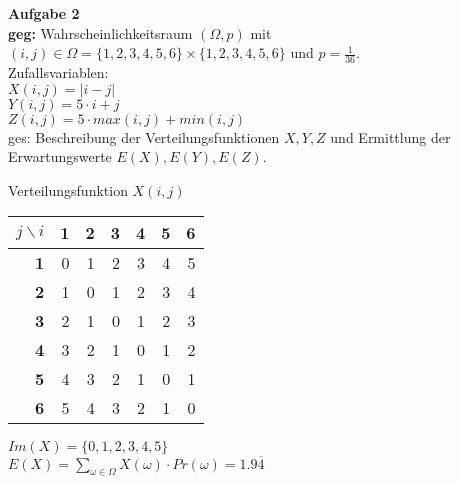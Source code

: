 \documentclass[a4paper]{scrartcl}
\begin{document}
	\begin{flushleft}
		\textbf{Aufgabe 2}\\
		\textbf{geg:} Wahrscheinlichkeitsraum $(\Omega,p)$ mit $(i,j)\in \Omega=\{1,2,3,4,5,6\}\times\{1,2,3,4,5,6\}$ und $p=\frac{1}{36}$.\\
		Zufallsvariablen:\\
		$X(i,j)=|i-j|$\\
		$Y(i,j)=5\cdot i+j$\\
		$Z(i,j)=5\cdot max(i,j)+min(i,j)$\\[1em]
		ges: Beschreibung der Verteilungsfunktionen $X,Y,Z$ und Ermittlung der Erwartungswerte $E(X),E(Y),E(Z)$.\\[1em]
		
		\begin{center}
		Verteilungsfunktion $X(i,j)$\\
		\begin{tabular}{|r|r|r|r|r|r|r|}
		\hline
		\multicolumn{1}{|c|}{$j\backslash i$} & \multicolumn{1}{c|}{\textbf{1}} & \multicolumn{1}{c|}{\textbf{2}} & \multicolumn{1}{c|}{\textbf{3}} & \multicolumn{1}{c|}{\textbf{4}} & \multicolumn{1}{c|}{\textbf{5}} & \multicolumn{1}{c|}{\textbf{6}} \\ \hline
		\textbf{1} & 0 & 1 & 2 & 3 & 4 & 5 \\ \hline
		\textbf{2} & 1 & 0 & 1 & 2 & 3 & 4 \\ \hline
		\textbf{3} & 2 & 1 & 0 & 1 & 2 & 3 \\ \hline
		\textbf{4} & 3 & 2 & 1 & 0 & 1 & 2 \\ \hline
		\textbf{5} & 4 & 3 & 2 & 1 & 0 & 1 \\ \hline
		\textbf{6} & 5 & 4 & 3 & 2 & 1 & 0 \\ \hline
		\end{tabular}
		\end{center}
		$Im(X)=\{0,1,2,3,4,5\}$\\
		$E(X)=\sum\limits_{\omega\in\Omega} X(\omega)\cdot Pr(\omega) = 1.9\overline{4}$\\[1em]


\end{flushleft}
\end{document}
